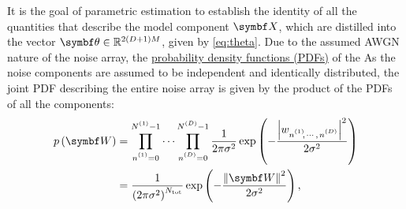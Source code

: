 It is the goal of parametric estimation to establish the
identity of all the quantities that describe the model component $\bX$, which
are distilled into the vector $\bth \in \mathbb{R}^{2(D + 1)M}$, given by
\cref{eq:theta}.
Due to the assumed \ac{AWGN} nature of the noise array, the
\ul{probability density functions (PDFs)} of the
\label{corr:complex-normal}%
As the noise components are assumed to be independent and identically
distributed, the joint \ac{PDF} describing the entire noise array is given by
the product of the \acp{PDF} of all the components:
\begin{equation}
    \begin{split}
        p\left(\bW\right) &=
            \prod_{\none=0}^{\None - 1}
            \cdots
            \prod_{\nD=0}^{\ND - 1}
            \frac{1}{2\pi \sigma^2}
            \exp\left(
                -\frac
                {\left\lvert \wnonenD \right\rvert^2}
                {2\sigma^2}\right) \\
            &= \frac{1}{\left(2\pi \sigma^2\right)^{N_{\text{tot}}}}
            \exp\left( -\frac{\left\lVert \bW \right\rVert^2}{2\sigma^2}\right),
    \end{split}
\end{equation}
